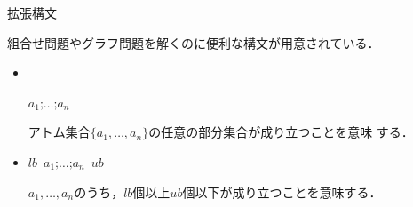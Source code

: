 \documentclass[dvipdfmx,11pt]{beamer}
\begin{document}
\begin{frame}[shrink]{拡張構文}
\begin{alertblock}{}\centering
  組合せ問題やグラフ問題を解くのに便利な構文が用意されている．
\end{alertblock}

\begin{itemize}
\item {}\\
  \begin{center}
   \code{\{}\(a_1\texttt{;}\dots\texttt{;}a_n\)\\
  \end{center}
  アトム集合\(\{a_1,\dots,a_n\}\)の任意の部分集合が成り立つことを意味
  する．
\item {}
  \begin{center}
   $lb$\ \code{\{}\(a_1\texttt{;}\dots\texttt{;}a_n\)\code{\}}\ $ub$
  \end{center}
  $a_1,\dots,a_n$のうち，$lb$個以上$ub$個以下が成り立つことを意味する．
\end{itemize}
\end{frame}
\end{document}
